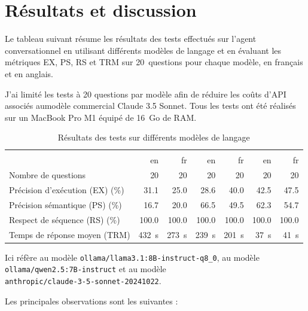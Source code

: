 \documentclass[a4paper,11pt]{article}
\begin{document}
\section{Résultats et discussion}
\label{sec:results}

Le tableau suivant résume les résultats des tests effectués sur l'agent conversationnel en utilisant différents modèles de langage et en évaluant les métriques EX, PS, RS et TRM
sur 20~questions pour chaque modèle, en français et en anglais.

J'ai limité les tests à 20 questions par modèle afin de réduire les coûts d'API associés aumodèle commercial Claude 3.5 Sonnet. Tous les tests ont été réalisés sur un MacBook Pro M1 équipé de 16~Go de RAM.


\begin{table}[h!]
\small
\centering
\begin{tabular}{l|r r|r r|r r}
\toprule
&  &  
&  \\
& {en} & {fr} & {en} & {fr} & {en} & {fr} \\
\midrule
Nombre de questions & 20 & 20 & 20 & 20 & 20 & 20 \\
Précision d'exécution (EX) (\%) & 31.1 & 25.0 & 28.6 & 40.0 & 42.5 & 47.5 \\
Précision sémantique (PS) (\%) & 16.7 & 20.0 & 66.5 & 49.5 & 62.3 & 54.7 \\
Respect de séquence (RS) (\%) & 100.0 & 100.0 & 100.0 & 100.0 & 100.0 & 100.0 \\
Temps de réponse moyen (TRM) & 432~s & 273~s & 239~s & 201~s & 37~s & 41~s \\
\bottomrule
\end{tabular}
\caption{Résultats des tests sur différents modèles de langage}
\label{tab:resultats}
\end{table}

\newpage
Ici  réfère au modèle \texttt{ollama/llama3.1:8B-instruct-q8\_0}, 
 au modèle \texttt{ollama/qwen2.5:7B-instruct} et 
 au modèle \\
\texttt{anthropic/claude-3-5-sonnet-20241022}.



Les principales observations sont les suivantes :
\end{document}
